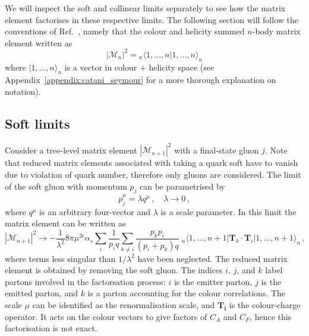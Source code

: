 \documentclass[main.tex]{subfiles}
\begin{document}
    We will inspect the soft and collinear limits separately
    to see how the matrix element factorises in these respective
    limits.
    The following section will follow the conventions
    of Ref.~\cite{Catani:1996vz}, namely that the colour and
    helicity summed $n$-body matrix element written as
    \begin{equation}\label{eqn:CS_matrix_element}
        |\mathcal{M}_{n}|^{2} = {}_{n}\langle 1, \ldots, n | 1, \ldots, n \rangle_{n}
    \end{equation}
    where $| 1, \ldots, n \rangle_{n}$ is a vector
    in colour + helicity space (see Appendix~\ref{appendix:catani_seymour}
    for a more thorough explanation on notation).

\subsection{Soft limits}\label{sec:me_soft}
    Consider a tree-level matrix element $|\mathcal{M}_{n+1}|^{2}$
    with a final-state gluon $j$. Note that reduced matrix
    elements associated with taking a quark soft have to vanish
    due to violation of quark number, therefore only gluons
    are considered.
    The limit of the soft gluon with momentum
    $p_{j}$ can be parametrised by
    \begin{equation}\label{eqn:soft_parametrisation}
        p_{j}^{\mu} = \lambda q^{\mu} \, , \quad \lambda \rightarrow 0 \, ,
    \end{equation}
    where $q^{\mu}$ is an arbitrary four-vector and $\lambda$
    is a scale parameter. In this limit the matrix element
    can be written as
    \begin{equation}\label{eqn:soft_factorisation}
        |\mathcal{M}_{n+1}|^{2} \rightarrow -\dfrac{1}{\lambda^{2}}8\pi \mu^{2\epsilon}\alpha_{s} \sum_{i}\dfrac{1}{p_{i}q}\sum_{k \neq i} \dfrac{p_{k}p_{i}}{(p_{i} + p_{k})q} \; {}_{n}\langle 1, \ldots, n+1 | \bm{T}_{k} \cdot \bm{T}_{i} | 1, \ldots, n+1 \rangle_{n} \, ,
    \end{equation}
    where terms less singular than $1 / \lambda^{2}$ have been
    neglected. The reduced matrix element is obtained by removing
    the soft gluon. The indices $i$, $j$, and $k$ label partons involved
    in the factorsation process: $i$ is the emitter parton,
    $j$ is the emitted parton, and $k$ is a parton accounting
    for the colour correlations. The scale $\mu$ can be identified as the
    renormalisation scale, and $\bm{T_{i}}$ is the colour-charge
    operator. It acts on the colour vectors to give factors of
    $C_{A}$ and $C_{F}$, hence this factorisation is not exact.
\end{document}
